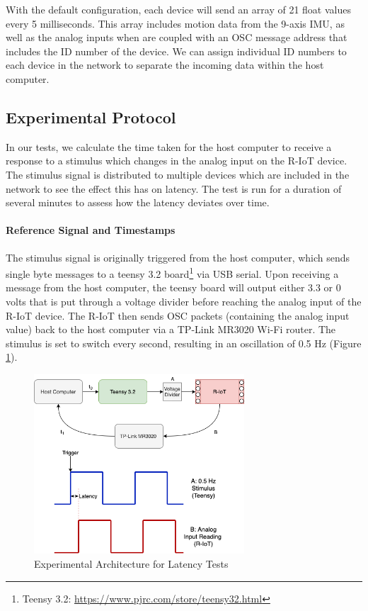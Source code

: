 With the default configuration, each device will send an array of 21 float values every 5 milliseconds. This array includes motion data from the 9-axis IMU, as well as the analog inputs when are coupled with an OSC message address that includes the ID number of the device. We can assign individual ID numbers to each device in the network to separate the incoming data within the host computer.

\subsection{Experimental Protocol}

In our tests, we calculate the time taken for the host computer to receive a response to a stimulus which changes in the analog input on the R-IoT device. The stimulus signal is distributed to multiple devices which are included in the network to see the effect this has on latency. The test is run for a duration of several minutes to assess how the latency deviates over time.

\paragraph{Reference Signal and Timestamps}
The stimulus signal is originally triggered from the host computer, which sends single byte messages to a teensy 3.2 board\footnote{Teensy 3.2: \url{https://www.pjrc.com/store/teensy32.html}} via USB serial. Upon receiving a message from the host computer, the teensy board will output either 3.3 or 0 volts that is put through a voltage divider before reaching the analog input of the R-IoT device. The R-IoT then sends OSC packets (containing the analog input value) back to the host computer via a TP-Link MR3020 Wi-Fi router. The stimulus is set to switch every second, resulting in an oscillation of 0.5 Hz (Figure \ref{fig:latency_fig1}).

\begin{figure}[htbp]
  \centering
    \includegraphics[width=0.7\textwidth]{Chapters/Figures/technical/Latency/figure1.png}
    \caption{Experimental Architecture for Latency Tests}
    \label{fig:latency_fig1}
\end{figure}

